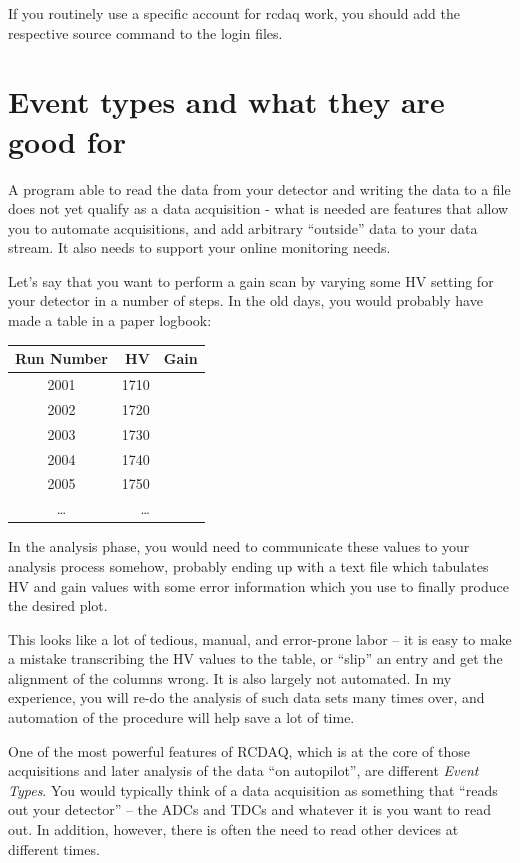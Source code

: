 \documentclass{article}[11pt]
\begin{document}
If you routinely use a specific account for rcdaq work, you should add the 
respective source command to the login files.  


\section{Event types and what they are good for}

A program able to read the data from your detector and writing the data
to a file does not yet qualify as a data acquisition - what is needed
are features that allow you to automate acquisitions, and add
arbitrary ``outside'' data to your data stream. It also needs to
support your online monitoring needs.

Let's say that you want to perform a gain scan by varying some HV
setting for your detector in a number of steps. In the old days, you
would probably have made a table in a paper logbook: 

\begin{center}

\begin{tabular}{|c|r|r|}
\hline
Run Number & HV & Gain \\
\hline
\hline
    2001 & 1710 &  \\ \hline
    2002 & 1720 &  \\ \hline
    2003 & 1730 &  \\ \hline
    2004 & 1740 &  \\ \hline
    2005 & 1750 &  \\ \hline
    \dots & \dots &  \\ \hline
\hline
\end{tabular}
\end{center}

In the analysis phase, you would need to communicate
these values to your analysis process somehow, probably ending up with
a text file which tabulates HV and gain values with some error
information which you use to finally produce the desired plot.

This looks like a lot of tedious, manual, and error-prone labor -- it
is easy to make a mistake transcribing the HV values to the table, or
``slip'' an entry and get the alignment of the columns wrong. It is
also largely not automated. In my experience, you will re-do the
analysis of such data sets many times over, and automation of the
procedure will help save a lot of time.

One of the most powerful features of RCDAQ, which is at the core of
those acquisitions and later analysis of the data ``on autopilot'', are
different \emph{Event Types}. You would typically think of a data
acquisition as something that ``reads out your detector'' -- the ADCs
and TDCs and whatever it is you want to read out. In addition,
however, there is often the need to read other devices at different times. 
\end{document}
